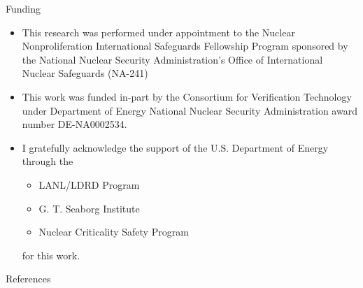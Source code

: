 \documentclass{beamer}
\begin{document}
\begin{frame}{Funding}
    \begin{itemize}
        \item This research was performed under appointment to the Nuclear Nonproliferation International Safeguards Fellowship Program sponsored by the National Nuclear Security Administration’s Office of International Nuclear Safeguards (NA-241)
        \item This work was funded in-part by the Consortium for Verification Technology under Department of Energy National Nuclear Security Administration award number DE-NA0002534.
        \item I gratefully acknowledge the support of the U.S. Department of Energy through the 
        \begin{itemize}
            \item LANL/LDRD Program
            \item G. T. Seaborg Institute
            \item Nuclear Criticality Safety Program
        \end{itemize} for this work.
    \end{itemize}

\end{frame}

\begin{frame}[allowframebreaks]{References}
    
{\footnotesize}
\end{frame}
\end{document}
